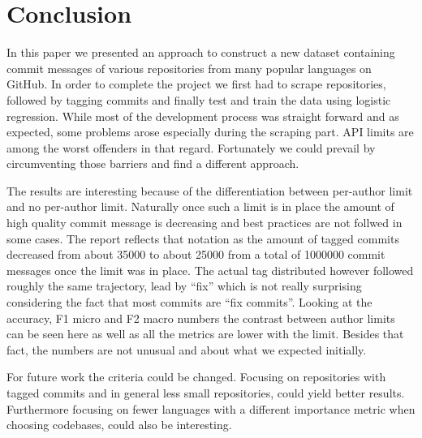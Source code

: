 \section{Conclusion}
\label{sec:conclusion}

In this paper we presented an approach to construct a new dataset containing
commit messages of various repositories from many popular languages on GitHub.
In order to complete the project we first had to scrape repositories, followed
by tagging commits and finally test and train the data using logistic
regression. While most of the development process was straight forward and as
expected, some problems arose especially during the scraping part. API limits
are among the worst offenders in that regard. Fortunately we could prevail by
circumventing those barriers and find a different approach.

The results are interesting because of the differentiation between per-author
limit and no per-author limit. Naturally once such a limit is in place the
amount of high quality commit message is decreasing and best practices are not
follwed in some cases. The report reflects that notation as the amount of
tagged commits decreased from about 35000 to about 25000 from a total of
1000000 commit messages once the limit was in place. The actual tag distributed
however followed roughly the same trajectory, lead by \enquote{fix} which is
not really surprising considering the fact that most commits are \enquote{fix commits}.
Looking at the accuracy, F1 micro and F2 macro numbers the contrast between
author limits can be seen here as well as all the metrics are lower with the
limit. Besides that fact, the numbers are not unusual and about what we
expected initially.

For future work the criteria could be changed. Focusing on repositories with
tagged commits and in general less small repositories, could yield better
results.  Furthermore focusing on fewer languages with a different importance
metric when choosing codebases, could also be interesting.


